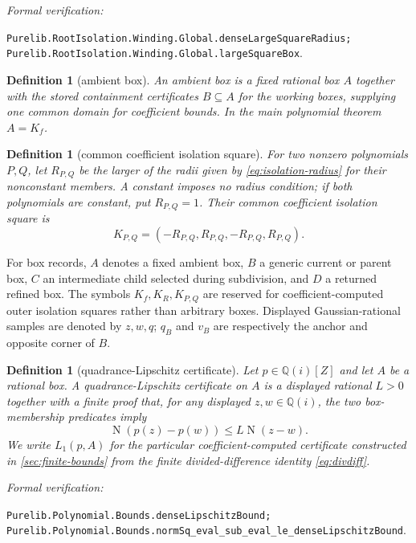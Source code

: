 \documentclass[11pt]{article}
\newtheorem{definition}[theorem]{Definition}
\newcommand{\Qi}{\mathbb{Q}(i)}
\newcommand{\Norm}[1]{\operatorname{N}\!\left(#1\right)}
\newcommand{\leanref}[1]{\par\smallskip\noindent
  \emph{Formal verification:}\par\nobreak
  {\raggedright\nolinkurl{#1}.\par}}
\begin{document}
\leanref{Purelib.RootIsolation.Winding.Global.denseLargeSquareRadius;
Purelib.RootIsolation.Winding.Global.largeSquareBox}

\begin{definition}[ambient box]
\label{def:ambient-box}
An \emph{ambient box} is a fixed rational box $A$
together with the stored containment certificates $B\subseteq A$ for the
working boxes, supplying one common domain for coefficient bounds.  In the
main polynomial theorem $A=K_f$.
\end{definition}

\begin{definition}[common coefficient isolation square]
\label{def:common-coefficient-isolation-square}
For two nonzero polynomials $P,Q$, let $R_{P,Q}$ be the larger of the radii
given by \eqref{eq:isolation-radius} for their nonconstant members.  A
constant imposes no radius condition; if both polynomials are constant, put
$R_{P,Q}=1$.  Their
\emph{common coefficient isolation square} is
\[
 K_{P,Q}=(-R_{P,Q},R_{P,Q},-R_{P,Q},R_{P,Q}).
\]
\end{definition}

For box records, $A$ denotes a fixed ambient box, $B$ a generic current or
parent box, $C$ an intermediate child selected during subdivision, and $D$
a returned refined box.  The symbols $K_f,K_R,K_{P,Q}$ are reserved for
coefficient-computed outer isolation squares rather than arbitrary boxes.
Displayed Gaussian-rational samples are denoted by $z,w,q$; $q_B$ and $v_B$
are respectively the anchor and opposite corner of $B$.

\begin{definition}[quadrance-Lipschitz certificate]
\label{def:quadrance-lipschitz}
Let $p\in\Qi[Z]$ and let $A$ be a rational box.  A
\emph{quadrance-Lipschitz certificate} on $A$ is a displayed rational
$L>0$ together with a finite proof that, for any displayed $z,w\in\Qi$,
the two box-membership predicates imply
\begin{equation}
\label{eq:quadrance-lipschitz}
             \Norm{p(z)-p(w)}\le L\Norm{z-w}.
\end{equation}
We write $L_1(p,A)$ for the particular coefficient-computed certificate
constructed in \cref{sec:finite-bounds} from the finite divided-difference
identity \eqref{eq:divdiff}.
\end{definition}

\leanref{Purelib.Polynomial.Bounds.denseLipschitzBound;
Purelib.Polynomial.Bounds.normSq_eval_sub_eval_le_denseLipschitzBound}
\end{document}
